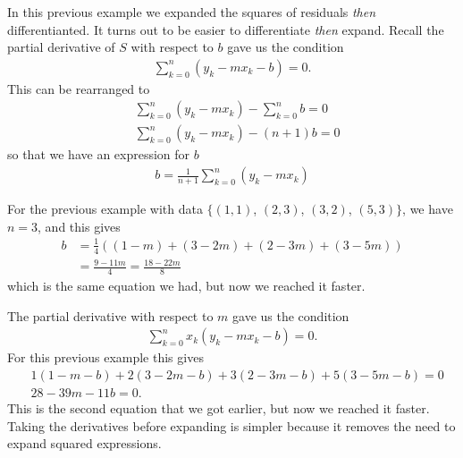 In this previous example we expanded the squares of residuals \textit{then} differentianted. It turns out to be easier to differentiate \textit{then} expand. Recall the partial derivative of $S$ with respect to $b$ gave us the condition
\begin{align*}
\sum_{k=0}^n \left(y_k - mx_k - b\right) = 0.
\end{align*}
This can be rearranged to
\begin{align*}
&\sum_{k=0}^n \left(y_k - mx_k\right) -  \sum_{k=0}^n b = 0 \\
&\sum_{k=0}^n \left(y_k - mx_k\right) -  (n+1) b = 0
\end{align*}
so that we have an expression for $b$
\begin{align*}
\boxed{b = \frac{1}{n+1}\sum_{k=0}^n \left(y_k - mx_k\right)}
\end{align*}

For the previous example with data $\{ (1,1)$, $(2,3)$, $(3,2)$, $(5,3) \}$, we have $n=3$, and this gives
\begin{align*}
b &= \frac{1}{4}\left( (1 - m) + (3-2m) + (2-3m) + (3-5m) \right) \\
&= \frac{9 - 11m}{4} = \frac{18 - 22m}{8}
\end{align*}
which is the same equation we had, but now we reached it faster.

The partial derivative with respect to $m$ gave us the condition
\begin{align*}
\sum_{k=0}^n x_k\left(y_k - mx_k - b\right) = 0.
\end{align*}
For this previous example this gives
\begin{align*}
& 1(1 - m - b) + 2(3-2m - b) + 3(2-3m - b) + 5(3-5m - b) = 0 \\
& 28 - 39m -11b = 0.
\end{align*}
This is the second equation that we got earlier, but now we reached it faster. Taking the derivatives before expanding is simpler because it removes the need to expand squared expressions.

